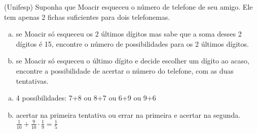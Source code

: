 \begin{ex}
 (Unifesp) Suponha que Moacir esqueceu o número de telefone de seu amigo. Ele tem apenas 2 fichas suficientes para dois telefonemas.
    \begin{enumerate}[(a)] 
    \item se Moacir só esqueceu os 2 últimos dígitos mas sabe que a soma desses 2 dígitos é 15, encontre o número de possibilidades para os 2 últimos dígitos.
    \item se Moacir só esqueceu o último dígito e decide escolher um dígito ao acaso, encontre a possibilidade de acertar o número do telefone, com as duas tentativas.
    \end{enumerate}
      \begin{sol}
         \phantom{A}  
        \begin{enumerate} [(a)]
            \item 4 possibilidades: 7+8 ou 8+7 ou 6+9 ou 9+6
            \item acertar na primeira tentativa ou errar na primeira e acertar na segunda.\\
            $\frac{1}{10}+\frac{9}{10}\cdot\frac{1}{9}=\frac{1}{5}$
        \end{enumerate}
      \end{sol}
\end{ex}